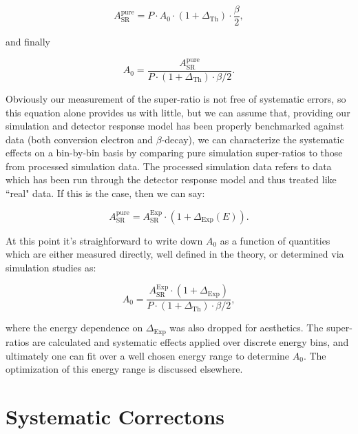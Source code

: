 \begin{equation}
A_{\mathrm{SR}}^{\mathrm{pure}} = P \cdot A_0 \cdot \left(1 + \Delta_{\mathrm{Th}} \right) \cdot \frac{\beta}{2}, 
\end{equation}

\noindent and finally

\begin{equation}
A_0 = \frac{A_{\mathrm{SR}}^{\mathrm{pure}}}{P \cdot \left( 1+\Delta_{\mathrm{Th}} \right) \cdot \beta/2}. 
\end{equation}

Obviously our measurement of the super-ratio is not free of systematic errors, so 
this equation alone provides us with little, but we can assume that, providing our
simulation and detector response model has been properly benchmarked against data (both conversion electron and 
$\beta$-decay), we can characterize the systematic effects on a bin-by-bin basis
by comparing pure simulation super-ratios to those from processed simulation data. The 
processed simulation data refers to data which has been run through the detector 
response model and thus treated like ``real" data. If this is the case, then we can say:

\begin{equation}
A_{\mathrm{SR}}^{\mathrm{pure}} = A_{\mathrm{SR}}^{\mathrm{Exp}} \cdot \left(1+\Delta_{\mathrm{Exp}}(E) \right).
\end{equation}

At this point it's straighforward to write down $A_0$ as a function of quantities 
which are either measured directly, well defined in the theory, or determined via simulation studies as:

\begin{equation}
A_0 = \frac{A_{\mathrm{SR}}^{\mathrm{Exp}} \cdot \left(1 + \Delta_{\mathrm{Exp}} \right) }{P \cdot \left( 1 + \Delta_{\mathrm{Th}} \right) \cdot \beta/2},
\end{equation}

\noindent where the energy dependence on $\Delta_{\mathrm{Exp}}$ was also dropped for 
aesthetics. The super-ratios are calculated and systematic effects applied 
over discrete energy bins, and ultimately one can fit over a well chosen energy range to determine $A_0$.
The optimization of this energy range is discussed elsewhere.


\section{Systematic Correctons}

